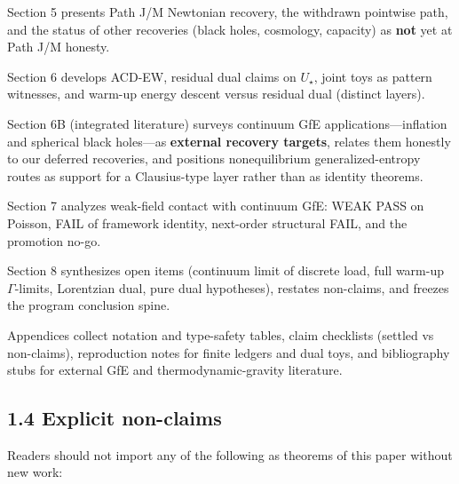 \documentclass[
  11pt,
]{article}
\newcounter{none} %
\begin{document}
Section 5 presents Path J/M Newtonian recovery, the withdrawn pointwise
path, and the status of other recoveries (black holes, cosmology,
capacity) as \textbf{not} yet at Path J/M honesty.

Section 6 develops ACD-EW, residual dual claims on \(U_\star\), joint
toys as pattern witnesses, and warm-up energy descent versus residual
dual (distinct layers).

Section 6B (integrated literature) surveys continuum GfE
applications---inflation and spherical black holes---as \textbf{external
recovery targets}, relates them honestly to our deferred recoveries, and
positions nonequilibrium generalized-entropy routes as support for a
Clausius-type layer rather than as identity theorems.

Section 7 analyzes weak-field contact with continuum GfE: WEAK PASS on
Poisson, FAIL of framework identity, next-order structural FAIL, and the
promotion no-go.

Section 8 synthesizes open items (continuum limit of discrete load, full
warm-up \(\Gamma\)-limits, Lorentzian dual, pure dual hypotheses),
restates non-claims, and freezes the program conclusion spine.

Appendices collect notation and type-safety tables, claim checklists
(settled vs non-claims), reproduction notes for finite ledgers and dual
toys, and bibliography stubs for external GfE and thermodynamic-gravity
literature.

\subsection{1.4 Explicit non-claims}\label{explicit-non-claims}

Readers should not import any of the following as theorems of this paper
without new work:
\end{document}
